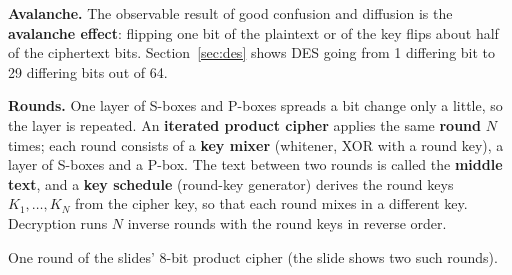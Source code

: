 \textbf{Avalanche.} The observable result of good confusion and diffusion is the \textbf{avalanche effect}: flipping one bit of the plaintext or of the key flips about half of the ciphertext bits. Section~\ref{sec:des} shows DES going from 1 differing bit to 29 differing bits out of 64.

\textbf{Rounds.} One layer of S-boxes and P-boxes spreads a bit change only a little, so the layer is repeated. An \textbf{iterated product cipher} applies the same \textbf{round} $N$ times; each round consists of a \textbf{key mixer} (whitener, XOR with a round key), a layer of S-boxes and a P-box. The text between two rounds is called the \textbf{middle text}, and a \textbf{key schedule} (round-key generator) derives the round keys $K_1, \dots, K_N$ from the cipher key, so that each round mixes in a different key. Decryption runs $N$ inverse rounds with the round keys in reverse order.
\begin{center}
\end{center}
\vspace{-2pt}
\centerline{\small One round of the slides' 8-bit product cipher (the slide shows two such rounds).}

